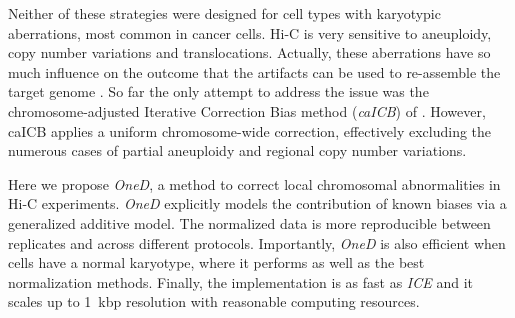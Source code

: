 \documentclass{bioinfo}
\begin{document}
Neither of these strategies were designed for cell types with
karyotypic aberrations, most common in cancer cells. Hi-C is very
sensitive to aneuploidy, copy number variations and translocations.
Actually, these aberrations have so much influence on the outcome that the
artifacts can be used to re-assemble the target genome
\citep{korbel2013genome}. So far the only attempt to address the issue
was the chromosome-adjusted Iterative Correction Bias method
(\textit{caICB}) of \cite{wu2016computational}.  However, caICB applies a
uniform chromosome-wide correction, effectively excluding the numerous
cases of partial aneuploidy and regional copy number variations.

Here we propose \textit{OneD}, a method to correct local chromosomal
abnormalities in Hi-C experiments. \textit{OneD} explicitly models the
contribution of known biases via a generalized additive model. The
normalized data is more reproducible between replicates and across
different protocols. Importantly, \textit{OneD} is also efficient when
cells have a normal karyotype, where it performs as well as the best
normalization methods. Finally, the implementation is as fast as
\textit{ICE} and it scales up to 1~kbp resolution with reasonable
computing resources.

\end{document}
